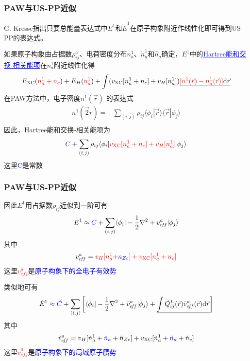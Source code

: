 \documentclass[cjk,slidestop,compress,mathserif,blue]{beamer}
\begin{document}
\frame
{
	\frametitle{\textrm{PAW}与\textrm{US-PP}近似}
	\textrm{G. Kresse}指出只要总能量表达式中$E^1$和$\tilde E^1$在原子构象附近作线性化即可得到\textrm{US-PP}的表达式。
	
	如果原子构象由占据数$\rho_{ij}^a$、电荷密度分布$n_a^1$、$\tilde n_a^1$和$\hat n_a$确定，$E^1$中的\textcolor{blue}{\underline{\textrm{Hartree}能和交换-相关能项}}在$n_a^1$附近线性化得
	\begin{displaymath}
		E_{\mathrm{XC}}(\textcolor{red}{n_a^1+n_c})+E_H(\textcolor{red}{n_a^1})+\int(v_{\mathrm{XC}}[n_a^1+n_c]+v_H[n_a^1])\underline{\textcolor{red}{[n^1(\vec r)-n_a^1(\vec r)]}\mathrm{d}\vec r}
	\end{displaymath}
	在\textrm{PAW}方法中，电子密度$n^1(\vec r)$%
	的表达式
	\begin{displaymath}
		\begin{aligned}
			n^1(\vec2 r)=&\sum_{(i,j)}\rho_{ij}\langle\phi_i|\vec r\rangle\langle\vec r|\phi_j\rangle\\
		\end{aligned}
	\end{displaymath}
	因此，\textrm{Hartree}能和交换-相关能项为
	$$\textcolor{blue}{C}+\sum_{(i,j)}\rho_{ij}\langle\phi_i|\textcolor{red}{v_{\mathrm{XC}}[n_a^1+n_c]+v_H[n_a^1]}|\phi_j\rangle$$
	这里\textcolor{blue}{\textrm{C}}是常数
}

\frame
{
	\frametitle{\textrm{PAW}与\textrm{US-PP}近似}
	因此$E^1$用占据数$\rho_{ij}$近似到一阶可有
	\begin{displaymath}
		E^1\approx\textcolor{blue}{C}+\sum_{(i,j)}\langle\phi_i|-\frac12\nabla^2+v_{e\!f\!f}^a|\phi_j\rangle
	\end{displaymath}
	其中
	\begin{displaymath}
		v_{e\!f\!f}^a=\textcolor{red}{v_H[n_a^1+}\textcolor{blue}{n_{Zc}}\textcolor{red}{]+v_{\mathrm{XC}}[n_a^1+n_c]}
	\end{displaymath}
	这里\textcolor{red}{$v_{e\!f\!f}^a$}是\textcolor{blue}{原子构象下的全电子有效势}

	类似地可有
	\begin{displaymath}
		\tilde E^1\approx\textcolor{blue}{\tilde C}+\sum_{(i,j)}\left[\langle\tilde\phi_i|-\frac12\nabla^2+\tilde v_{e\!f\!f}^a|\tilde\phi_j\rangle+\underline{\int\tilde Q_{ij}^L(\vec r)\tilde v_{e\!f\!f}^a(\vec r)\mathrm{d}\vec r}\right]
	\end{displaymath}
	其中$$\tilde v_{e\!f\!f}^a=v_H[\tilde n_a^1+\textcolor{blue}{\hat n_a}+\tilde n_{Zc}]+v_{\mathrm{XC}}[\tilde n_a^1+\textcolor{blue}{\hat n_a}+\tilde n_c]$$
	这里\textcolor{red}{$\tilde v_{e\!f\!f}^a$}是\textcolor{blue}{原子构象下的局域原子赝势}
}
\end{document}
